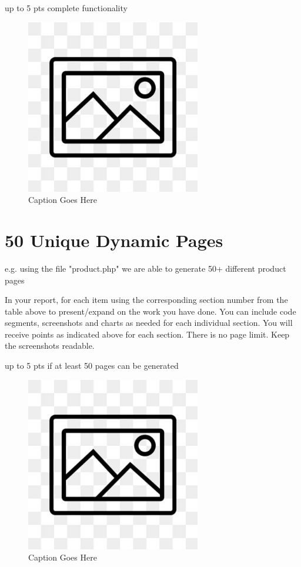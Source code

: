 \documentclass[12pt, letterpaper]{article}
\begin{document}
up to 5 pts complete functionality

\begin{figure}[htbp]
	\centering
	\includegraphics[width=3in]{images/placeholder.jpg}
	\caption{Caption Goes Here}
 \end{figure}

 \newpage

\section{50 Unique Dynamic Pages}
e.g. using the file "product.php" we are able to generate 50+ different product pages

In your report, for each item using the corresponding section number from the table above to present/expand on the work you have done. You can include code segments, screenshots and charts as needed for each individual section. You will receive points as indicated above for each section. There is no page limit. Keep the screenshots readable.

up to 5 pts if at least 50 pages can be generated

\begin{figure}[htbp]
	\centering
	\includegraphics[width=3in]{images/placeholder.jpg}
	\caption{Caption Goes Here}
 \end{figure}
\end{document}
